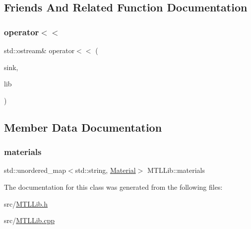 \subsection{Friends And Related Function Documentation}
\mbox{\label{classMTLLib_a8827df67313eff58b309533133a8f437}} 
\subsubsection{\texorpdfstring{operator$<$$<$}{operator<<}}
{\footnotesize\ttfamily std\+::ostream\& operator$<$$<$ (\begin{DoxyParamCaption}\item[{std\+::ostream \&}]{sink,  }\item[{const \mbox{\hyperlink{classMTLLib}{M\+T\+L\+Lib}} \&}]{lib }\end{DoxyParamCaption})\hspace{0.3cm}{\ttfamily [friend]}}



\subsection{Member Data Documentation}
\mbox{\label{classMTLLib_aff9c5fb2df226fe6c383ed8faaf9e49d}} 
\subsubsection{\texorpdfstring{materials}{materials}}
{\footnotesize\ttfamily std\+::unordered\+\_\+map$<$std\+::string, \mbox{\hyperlink{classMaterial}{Material}}$>$ M\+T\+L\+Lib\+::materials\hspace{0.3cm}{\ttfamily [private]}}



The documentation for this class was generated from the following files\+:\begin{DoxyCompactItemize}
\item 
src/\mbox{\hyperlink{MTLLib_8h}{M\+T\+L\+Lib.\+h}}\item 
src/\mbox{\hyperlink{MTLLib_8cpp}{M\+T\+L\+Lib.\+cpp}}\end{DoxyCompactItemize}
